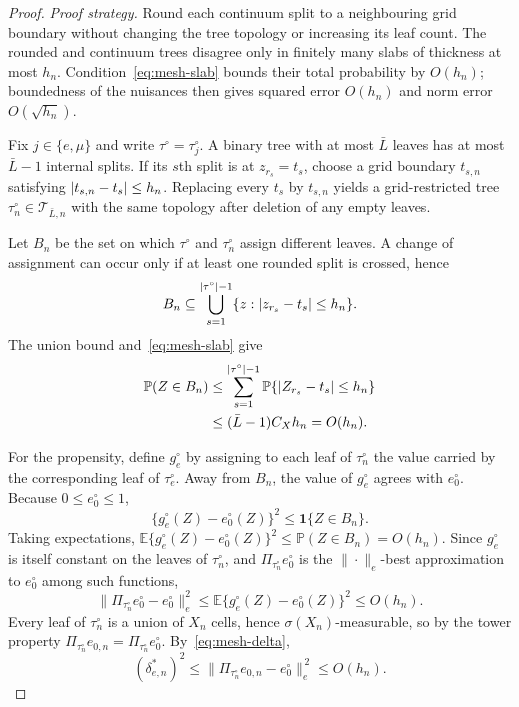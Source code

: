 \documentclass[11pt]{article}
\theoremstyle{plain}
\theoremstyle{definition}
\theoremstyle{remark}
\newcommand{\E}{\mathbb{E}}
\newcommand{\PP}{\mathbb{P}}
\newcommand{\cT}{\mathcal{T}}
\newcommand{\ez}{e_0}
\DeclarePairedDelimiter{\abs}{\lvert}{\rvert}
\DeclarePairedDelimiter{\card}{\lvert}{\rvert}
\newcommand{\ezn}{e_{0,n}}
\begin{document}
\begin{proof}
\emph{Proof strategy.} Round each continuum split to a neighbouring grid
boundary without changing the tree topology or increasing its leaf count.
The rounded and continuum trees disagree only in finitely many slabs of
thickness at most $h_n$. Condition~\eqref{eq:mesh-slab} bounds their total
probability by $O(h_n)$; boundedness of the nuisances then gives squared
error $O(h_n)$ and norm error $O(\sqrt{h_n})$.

Fix $j\in\{e,\mu\}$ and write $\tau^\circ=\tau_j^\circ$. A binary tree with
at most $\bar L$ leaves has at most $\bar L-1$ internal splits. If its $s$th
split is at $z_{r_s}=t_s$, choose a grid boundary $t_{s,n}$ satisfying
$\abs{t_{s,n}-t_s}\le h_n$. Replacing every $t_s$ by $t_{s,n}$ yields a
grid-restricted tree $\tau_n^\circ\in\cT_{\bar L,n}$ with the same topology
after deletion of any empty leaves.

Let $B_n$ be the set on which $\tau^\circ$ and $\tau_n^\circ$ assign
different leaves. A change of assignment can occur only if at least one
rounded split is crossed, hence
\[
  B_n\subseteq\bigcup_{s=1}^{\card{\tau^\circ}-1}
  \{z:\abs{z_{r_s}-t_s}\le h_n\}.
\]
The union bound and~\eqref{eq:mesh-slab} give
\begin{align}
  \PP(Z\in B_n)
  &\le\sum_{s=1}^{\card{\tau^\circ}-1}\PP\{\abs{Z_{r_s}-t_s}\le h_n\}\\
  &\le(\bar L-1)C_Xh_n=O(h_n).
  \label{eq:mesh-boundary-mass}
\end{align}

For the propensity, define $g^\circ_e$ by assigning to each leaf of
$\tau_n^\circ$ the value carried by the corresponding leaf of $\tau_e^\circ$.
Away from $B_n$, the value of $g^\circ_e$ agrees with $\ez^\circ$. Because
$0\le\ez^\circ\le1$,
\[
  \{g^\circ_e(Z)-\ez^\circ(Z)\}^2\le\mathbf1\{Z\in B_n\}.
\]
Taking expectations,
$\E\{g^\circ_e(Z)-\ez^\circ(Z)\}^{2}\le\PP(Z\in B_n)=O(h_n)$.
Since $g^\circ_e$ is itself constant on the leaves
of $\tau_n^\circ$, and $\Pi_{\tau_n^\circ}\ez^\circ$ is the $\|\cdot\|_e$-best
approximation to $\ez^\circ$ among such functions,
\[
  \|\Pi_{\tau_n^\circ}\ez^\circ-\ez^\circ\|_e^2
  \le\E\{g^\circ_e(Z)-\ez^\circ(Z)\}^{2}\le O(h_n).
\]
Every leaf of $\tau_n^\circ$ is a union of $X_n$ cells, hence
$\sigma(X_n)$-measurable, so by the tower property
$\Pi_{\tau_n^\circ}\ezn=\Pi_{\tau_n^\circ}\ez^\circ$. By~\eqref{eq:mesh-delta},
\[
  (\delta^*_{e,n})^2
  \le\|\Pi_{\tau_n^\circ}\ezn-\ez^\circ\|_e^{\,2}\le O(h_n).
\]


\end{proof}
\end{document}
